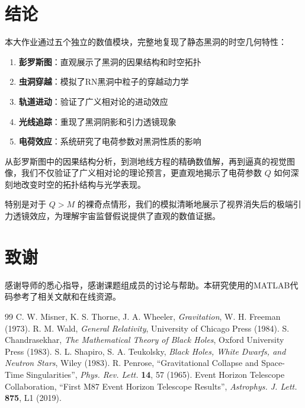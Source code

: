 \documentclass[a4paper,12pt]{article}
\begin{document}
\section{结论}

本大作业通过五个独立的数值模块，完整地复现了静态黑洞的时空几何特性：

\begin{enumerate}
    \item \textbf{彭罗斯图}：直观展示了黑洞的因果结构和时空拓扑
    \item \textbf{虫洞穿越}：模拟了RN黑洞中粒子的穿越动力学
    \item \textbf{轨道进动}：验证了广义相对论的进动效应
    \item \textbf{光线追踪}：重现了黑洞阴影和引力透镜现象
    \item \textbf{电荷效应}：系统研究了电荷参数对黑洞性质的影响
\end{enumerate}

从彭罗斯图中的因果结构分析，到测地线方程的精确数值解，再到逼真的视觉图像，我们不仅验证了广义相对论的理论预言，更直观地揭示了电荷参数 $Q$ 如何深刻地改变时空的拓扑结构与光学表现。

特别是对于 $Q > M$ 的裸奇点情形，我们的模拟清晰地展示了视界消失后的极端引力透镜效应，为理解宇宙监督假说提供了直观的数值证据。

\section*{致谢}

感谢导师的悉心指导，感谢课题组成员的讨论与帮助。本研究使用的MATLAB代码参考了相关文献和在线资源。

\begin{thebibliography}{99}
 C. W. Misner, K. S. Thorne, J. A. Wheeler, \emph{Gravitation}, W. H. Freeman (1973).
 R. M. Wald, \emph{General Relativity}, University of Chicago Press (1984).
 S. Chandrasekhar, \emph{The Mathematical Theory of Black Holes}, Oxford University Press (1983).
 S. L. Shapiro, S. A. Teukolsky, \emph{Black Holes, White Dwarfs, and Neutron Stars}, Wiley (1983).
 R. Penrose, ``Gravitational Collapse and Space-Time Singularities'', \emph{Phys. Rev. Lett.} \textbf{14}, 57 (1965).
 Event Horizon Telescope Collaboration, ``First M87 Event Horizon Telescope Results'', \emph{Astrophys. J. Lett.} \textbf{875}, L1 (2019).
\end{thebibliography}
\end{document}
